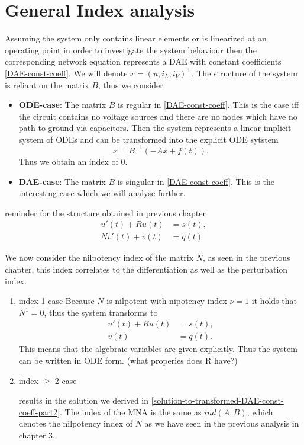 \section{General Index analysis}

Assuming the system only contains linear elements or is linearized at an operating point in order to investigate the system behaviour then the corresponding network equation represents a DAE with constant coefficients \ref{DAE-const-coeff}. We will denote $x=(u, i_L, i_V)^\top$. The structure of the system is reliant on the matrix $B$, thus we consider

\begin{itemize}
	\item \textbf{ODE-case}: \newline
	The matrix $B$ is regular in \ref{DAE-const-coeff}. This is the case iff the circuit contains no voltage sources and there are no nodes which have no path to ground via capacitors. Then the system represents a linear-implicit system of ODEs and can be transformed into the explicit ODE sytstem
	\begin{displaymath}
		\dot{x}=B^{-1}(-Ax+f(t)).
	\end{displaymath}
	Thus we obtain an index of $0$.
		
	\item \textbf{DAE-case}:
	The matrix $B$ is singular in \ref{DAE-const-coeff}. This is the interesting case which we will analyse further.
\end{itemize}

reminder for the structure obtained in previous chapter
\begin{align*}
	u'(t) + Ru(t) &= s(t), \\
	Nv'(t) + v(t) &= q(t)
\end{align*}

We now consider the nilpotency index of the matrix $N$, as seen in the previous chapter, this index correlates to the differentiation as well as the perturbation index.

\begin{enumerate}
	\item index 1 case
	Because $N$ is nilpotent with nipotency index $\nu = 1$ it holds that $N^1 = 0$, thus the system transforms to
	\begin{align*}
		u'(t) + Ru(t) &= s(t), \\
		v(t) &= q(t).
	\end{align*}
	This means that the algebraic variables are given explicitly. Thus the system can be written in ODE form. (what properies does R have?)

	\item index $\geq$ 2 case
	
	results in the solution we derived in \ref{solution-to-transformed-DAE-const-coeff-part2}. The index of the MNA is the same as $ind(A,B)$, which denotes the nilpotency index of $N$ as we have seen in the previous analysis in chapter 3.
\end{enumerate}

